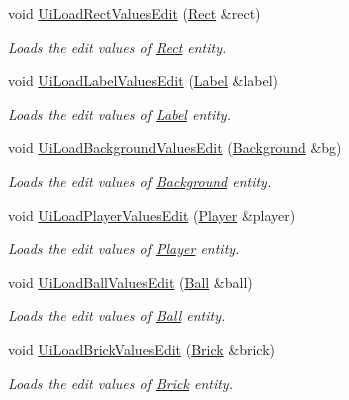\begin{DoxyCompactItemize}
void \hyperlink{class_user_interface_a26d5dac3f33fb986164c6c7c8cfc5545}{Ui\+Load\+Rect\+Values\+Edit} (\hyperlink{class_rect}{Rect} \&rect)
\begin{DoxyCompactList}\small\item\em Loads the edit values of \hyperlink{class_rect}{Rect} entity. \end{DoxyCompactList}\item 
void \hyperlink{class_user_interface_a586a26b3ec692b0374d3b5042e685a4a}{Ui\+Load\+Label\+Values\+Edit} (\hyperlink{class_label}{Label} \&label)
\begin{DoxyCompactList}\small\item\em Loads the edit values of \hyperlink{class_label}{Label} entity. \end{DoxyCompactList}\item 
void \hyperlink{class_user_interface_a57b2c3ffd6d2f7e34644e3789be1046e}{Ui\+Load\+Background\+Values\+Edit} (\hyperlink{class_background}{Background} \&bg)
\begin{DoxyCompactList}\small\item\em Loads the edit values of \hyperlink{class_background}{Background} entity. \end{DoxyCompactList}\item 
void \hyperlink{class_user_interface_a5546e5650bf7c4cdb0e41422655ac729}{Ui\+Load\+Player\+Values\+Edit} (\hyperlink{class_player}{Player} \&player)
\begin{DoxyCompactList}\small\item\em Loads the edit values of \hyperlink{class_player}{Player} entity. \end{DoxyCompactList}\item 
void \hyperlink{class_user_interface_a94c4746d22e6b1fd0cc04a402b54db27}{Ui\+Load\+Ball\+Values\+Edit} (\hyperlink{class_ball}{Ball} \&ball)
\begin{DoxyCompactList}\small\item\em Loads the edit values of \hyperlink{class_ball}{Ball} entity. \end{DoxyCompactList}\item 
void \hyperlink{class_user_interface_ae7c86ad6ac894f930e04bccd7da28f78}{Ui\+Load\+Brick\+Values\+Edit} (\hyperlink{class_brick}{Brick} \&brick)
\begin{DoxyCompactList}\small\item\em Loads the edit values of \hyperlink{class_brick}{Brick} entity. \end{DoxyCompactList}\item 

\end{DoxyCompactItemize}
